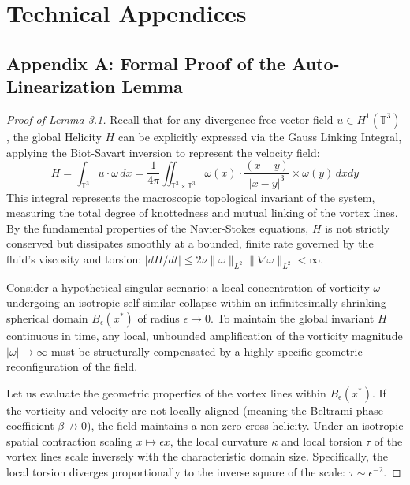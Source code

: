 \documentclass[12pt,a4paper]{article}
\theoremstyle{plain}
\theoremstyle{definition}
\theoremstyle{remark}
\begin{document}
\section{Technical Appendices}

\subsection{Appendix A: Formal Proof of the Auto-Linearization Lemma}
\begin{proof}[Proof of Lemma 3.1]
Recall that for any divergence-free vector field $u \in H^1(\mathbb{T}^3)$, the global Helicity $H$ can be explicitly expressed via the Gauss Linking Integral, applying the Biot-Savart inversion to represent the velocity field:
\begin{equation}
    H = \int_{\mathbb{T}^3} u \cdot \omega \, dx = \frac{1}{4\pi} \iint_{\mathbb{T}^3 \times \mathbb{T}^3} \omega(x) \cdot \frac{(x-y)}{|x-y|^3} \times \omega(y) \, dx dy
\end{equation}
This integral represents the macroscopic topological invariant of the system, measuring the total degree of knottedness and mutual linking of the vortex lines. By the fundamental properties of the Navier-Stokes equations, $H$ is not strictly conserved but dissipates smoothly at a bounded, finite rate governed by the fluid's viscosity and torsion: $|dH/dt| \leq 2\nu \|\omega\|_{L^2} \|\nabla \omega\|_{L^2} < \infty$.

Consider a hypothetical singular scenario: a local concentration of vorticity $\omega$ undergoing an isotropic self-similar collapse within an infinitesimally shrinking spherical domain $B_\epsilon(x^*)$ of radius $\epsilon \to 0$. To maintain the global invariant $H$ continuous in time, any local, unbounded amplification of the vorticity magnitude $|\omega| \to \infty$ must be structurally compensated by a highly specific geometric reconfiguration of the field.

Let us evaluate the geometric properties of the vortex lines within $B_\epsilon(x^*)$. If the vorticity and velocity are not locally aligned (meaning the Beltrami phase coefficient $\beta \not\to 0$), the field maintains a non-zero cross-helicity. Under an isotropic spatial contraction scaling $x \mapsto \epsilon x$, the local curvature $\kappa$ and local torsion $\tau$ of the vortex lines scale inversely with the characteristic domain size. Specifically, the local torsion diverges proportionally to the inverse square of the scale: $\tau \sim \epsilon^{-2}$. 


\end{proof}
\end{document}
